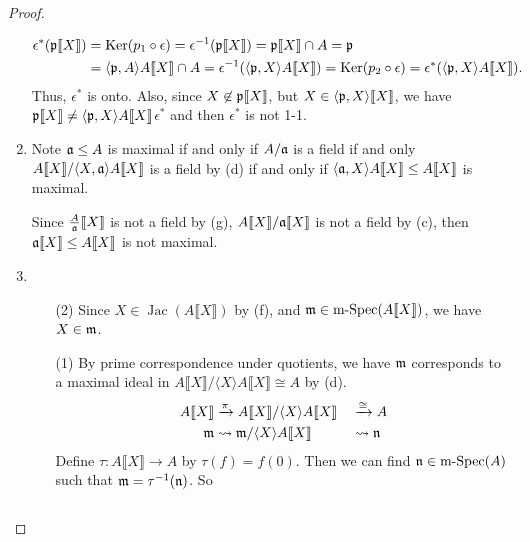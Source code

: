 \begin{proof}
\begin{enumerate}
\begin{align*}
                \epsilon^*(\mathfrak{p} \llbracket X \rrbracket) &= \operatorname{Ker}(p_1 \circ \epsilon) = \epsilon^{-1}(\mathfrak{p} \llbracket X \rrbracket) = \mathfrak{p} \llbracket X \rrbracket \cap A = \mathfrak{p} \\
                                                         &= \langle \mathfrak{p},A \rangle A\llbracket X \rrbracket \cap A = \epsilon^{-1}(\langle \mathfrak{p},X \rangle A\llbracket X \rrbracket) = \operatorname{Ker}(p_2 \circ \epsilon) = \epsilon^*(\langle \mathfrak{p},X \rangle A\llbracket X \rrbracket). 
            \end{align*}
            Thus, $\epsilon^*$ is onto. Also, since $X \not \in \mathfrak{p} \llbracket X \rrbracket$, but $X \in \langle \mathfrak{p},X \rangle \llbracket X \rrbracket$, we have $\mathfrak{p}\llbracket X \rrbracket \neq \langle \mathfrak{p},X \rangle A\llbracket X \rrbracket$$\epsilon^*$ and then $\epsilon^*$ is not 1-1.
        \item 
            Note $\mathfrak{a} \leq A$ is maximal if and only if $A/\mathfrak{a}$ is a field if and only $A\llbracket X \rrbracket / \langle X,\mathfrak{a} \rangle A\llbracket X \rrbracket$ is a field by (d) if and only if $\langle \mathfrak{a},X \rangle A\llbracket X \rrbracket \leq A\llbracket X \rrbracket$ is maximal. \par 
            Since $\frac{A}{\mathfrak{a}}\llbracket X \rrbracket$ is not a field by (g), $A\llbracket X \rrbracket / \mathfrak{a} \llbracket X \rrbracket$ is not a field by (c), then $\mathfrak{a} \llbracket X \rrbracket \leq A\llbracket X \rrbracket$ is not maximal. 
        \item 
            \begin{enumerate}
                \item [(2)]
                    Since $X \in \operatorname{Jac}(A\llbracket X \rrbracket)$ by (f), and $\mathfrak{m} \in \operatorname{m-Spec}(A\llbracket X \rrbracket)$, we have $X \in \mathfrak{m}$. 
                \item [(1)]
                    By prime correspondence under quotients, we have $\mathfrak{m}$ corresponds to a maximal ideal in $A\llbracket X \rrbracket/\langle X \rangle A \llbracket X \rrbracket \cong A$ by (d).
                    \begin{alignat*}{2}
                        A\llbracket X \rrbracket &\xrightarrow{\pi} A\llbracket X \rrbracket/\langle X \rangle A\llbracket X \rrbracket &&\xrightarrow \cong A \\
                        \mathfrak{m} &\leadsto \mathfrak{m}/\langle X \rangle A\llbracket X \rrbracket &&\leadsto \mathfrak{n}
                    \end{alignat*}
                    Define $\tau: A\llbracket X \rrbracket \to A$ by $\tau(f) = f(0)$. Then we can find $\mathfrak{n} \in \operatorname{m-Spec}(A)$ such that $\mathfrak{m} = \tau^{-1}(\mathfrak{n})$. So 

\end{enumerate}$$
\end{enumerate}
\end{proof}
